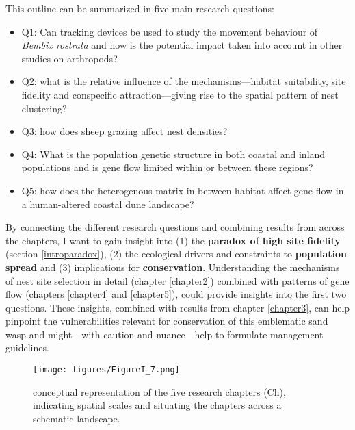 \documentclass[10pt, twoside]{book} %
\begin{document}
	This outline can be summarized in five main research questions:
	\begin{itemize}
		\item Q1: Can tracking devices be used to study the movement behaviour of \textit{Bembix rostrata} and how is the potential impact taken into account in other studies on arthropods?
		
		\item Q2: what is the relative influence of the mechanisms---habitat suitability, site fidelity and conspecific attraction---giving rise to the spatial pattern of nest clustering?
		
		\item Q3: how does sheep grazing affect nest densities?
		
		\item Q4: What is the population genetic structure in both coastal and inland populations and is gene flow limited within or between these regions?
		
		\item Q5: how does the heterogenous matrix in between habitat affect gene flow in a human-altered coastal dune landscape?
		
	\end{itemize}
	
	By connecting the different research questions and combining results from across the chapters, I want to gain insight into (1) the \textbf{paradox of high site fidelity} (section \ref{introparadox}), (2) the ecological drivers and constraints to \textbf{population spread} and (3) implications for \textbf{conservation}. Understanding the mechanisms of nest site selection in detail (chapter \ref{chapter2}) combined with patterns of gene flow (chapters \ref{chapter4} and \ref{chapter5}), could provide insights into the first two questions. These insights, combined with results from chapter \ref{chapter3}, can help pinpoint the vulnerabilities relevant for conservation of this emblematic sand wasp and might---with caution and nuance---help to formulate management guidelines.\\

\vspace*{2cm}
	\begin{figure}[hb!]
		\begin{center}
			\texttt{[image: figures/FigureI\_7.png]}
		\end{center}
		\begin{footnotesize}
			\caption{conceptual representation of the five research chapters (Ch), indicating spatial scales and situating the chapters across a schematic landscape. \label{figI.7}}
		\end{footnotesize}
	\end{figure}
\clearpage
\end{document}
